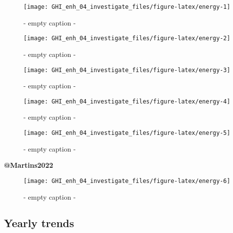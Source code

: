 \documentclass[
  10pt,
  a4paper,oneside]{article}
\begin{document}
\begin{figure}[H]

{\centering \texttt{[image: GHI\_enh\_04\_investigate\_files/figure-latex/energy-1]} 

}

\caption{ - empty caption - }\label{fig:energy-1}
\end{figure}
\begin{figure}[H]

{\centering \texttt{[image: GHI\_enh\_04\_investigate\_files/figure-latex/energy-2]} 

}

\caption{ - empty caption - }\label{fig:energy-2}
\end{figure}
\begin{figure}[H]

{\centering \texttt{[image: GHI\_enh\_04\_investigate\_files/figure-latex/energy-3]} 

}

\caption{ - empty caption - }\label{fig:energy-3}
\end{figure}
\begin{figure}[H]

{\centering \texttt{[image: GHI\_enh\_04\_investigate\_files/figure-latex/energy-4]} 

}

\caption{ - empty caption - }\label{fig:energy-4}
\end{figure}
\begin{figure}[H]

{\centering \texttt{[image: GHI\_enh\_04\_investigate\_files/figure-latex/energy-5]} 

}

\caption{ - empty caption - }\label{fig:energy-5}
\end{figure}

\textbf{@Martins2022}

\begin{figure}[H]

{\centering \texttt{[image: GHI\_enh\_04\_investigate\_files/figure-latex/energy-6]} 

}

\caption{ - empty caption - }\label{fig:energy-6}
\end{figure}

\newpage

\hypertarget{yearly-trends}{%
\subsection{Yearly trends}\label{yearly-trends}}
\end{document}
